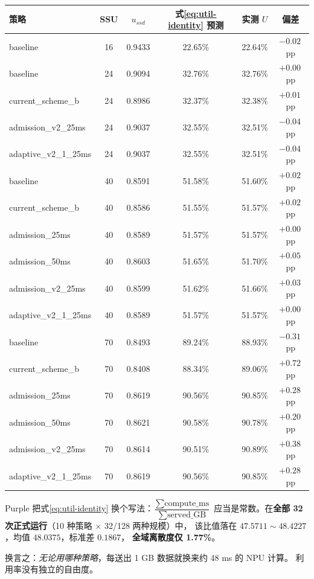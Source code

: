 \documentclass[UTF8,fontset=none,10pt,a4paper]{ctexart}
\newcommand{\pp}{\,pp}
\begin{document}
\begin{tabularx}{\textwidth}{p{37mm} C C C C C}
\toprule
策略 & SSU & $u_{ssd}$ & 式\eqref{eq:util-identity} 预测 & 实测 $U$ & 偏差\\
\midrule
baseline            & 16 & 0.9433 & 22.65\% & 22.64\% & $-0.02$\pp\\
baseline            & 24 & 0.9094 & 32.76\% & 32.76\% & $+0.00$\pp\\
current\_scheme\_b  & 24 & 0.8986 & 32.37\% & 32.38\% & $+0.01$\pp\\
admission\_v2\_25ms & 24 & 0.9037 & 32.55\% & 32.51\% & $-0.04$\pp\\
adaptive\_v2\_1\_25ms & 24 & 0.9037 & 32.55\% & 32.51\% & $-0.04$\pp\\
baseline            & 40 & 0.8591 & 51.58\% & 51.60\% & $+0.02$\pp\\
current\_scheme\_b  & 40 & 0.8586 & 51.55\% & 51.57\% & $+0.02$\pp\\
admission\_25ms     & 40 & 0.8589 & 51.57\% & 51.57\% & $+0.00$\pp\\
admission\_50ms     & 40 & 0.8603 & 51.65\% & 51.70\% & $+0.05$\pp\\
admission\_v2\_25ms & 40 & 0.8599 & 51.62\% & 51.66\% & $+0.03$\pp\\
adaptive\_v2\_1\_25ms & 40 & 0.8589 & 51.57\% & 51.57\% & $+0.00$\pp\\
baseline            & 70 & 0.8493 & 89.24\% & 88.93\% & $-0.31$\pp\\
current\_scheme\_b  & 70 & 0.8408 & 88.34\% & 89.06\% & $+0.72$\pp\\
admission\_25ms     & 70 & 0.8619 & 90.56\% & 90.85\% & $+0.28$\pp\\
admission\_50ms     & 70 & 0.8621 & 90.58\% & 90.78\% & $+0.20$\pp\\
admission\_v2\_25ms & 70 & 0.8614 & 90.51\% & 90.89\% & $+0.38$\pp\\
adaptive\_v2\_1\_25ms & 70 & 0.8619 & 90.56\% & 90.85\% & $+0.28$\pp\\
\bottomrule
\end{tabularx}

\begin{insightbox}[title={等价说法：每 GB 数据对应 48.0 ms 计算}]{Purple}
把式\eqref{eq:util-identity} 换个写法：$\dfrac{\sum \text{compute\_ms}}{\sum \text{served\_GB}}$
应当是常数。在\textbf{全部 32 次正式运行}（10 种策略 $\times$ 32/128 两种规模）中，
该比值落在 $47.5711 \sim 48.4227$，均值 $48.0375$，标准差 $0.1867$，
\textbf{全域离散度仅 1.77\%}。\par\smallskip
换言之：\emph{无论用哪种策略}，每送出 1 GB 数据就换来约 48 ms 的 NPU 计算。
利用率没有独立的自由度。
\end{insightbox}
\end{document}
